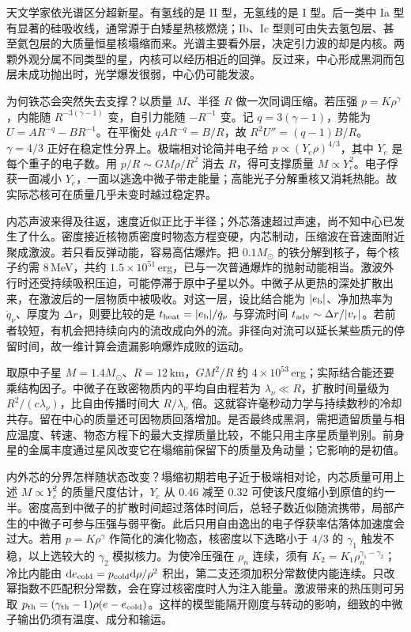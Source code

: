 天文学家依光谱区分超新星。有氢线的是 II 型，无氢线的是 I 型。后一类中 Ia 型有显著的硅吸收线，通常源于白矮星热核燃烧；Ib、Ic 型则可由失去氢包层、甚至氦包层的大质量恒星核塌缩而来。光谱主要看外层，决定引力波的却是内核。两颗外观分属不同类型的星，内核可以经历相近的回弹。反过来，中心形成黑洞而包层未成功抛出时，光学爆发很弱，中心仍可能发波。

为何铁芯会突然失去支撑？以质量 $M$、半径 $R$ 做一次同调压缩。若压强 $p=K\rho^\gamma$，内能随 $R^{-3(\gamma-1)}$ 变，自引力能随 $-R^{-1}$ 变。记 $q=3(\gamma-1)$，势能为 $U=A R^{-q}-B R^{-1}$。在平衡处 $q A R^{-q}=B/R$，故 $R^2 U''=(q-1)B/R$。$\gamma=4/3$ 正好在稳定性分界上。极端相对论简并电子给 $p\propto(Y_e\rho)^{4/3}$，其中 $Y_e$ 是每个重子的电子数。用 $p/R\sim GM\rho/R^2$ 消去 $R$，得可支撑质量 $M\propto Y_e^2$。电子俘获一面减小 $Y_e$，一面以逃逸中微子带走能量；高能光子分解重核又消耗热能。故实际芯核可在质量几乎未变时越过稳定界。

内芯声波来得及往返，速度近似正比于半径；外芯落速超过声速，尚不知中心已发生了什么。密度接近核物质密度时物态方程变硬，内芯制动，压缩波在音速面附近聚成激波。若只看反弹动能，容易高估爆炸。把 $0.1M_\odot$ 的铁分解到核子，每个核子约需 $8$\,MeV，共约 $1.5\times10^{51}$\,erg，已与一次普通爆炸的抛射动能相当。激波外行时还受持续吸积压迫，可能停滞于原中子星以外。中微子从更热的深处扩散出来，在激波后的一层物质中被吸收。对这一层，设比结合能为 $|e_{\rm b}|$、净加热率为 $\dot q_\nu$、厚度为 $\Delta r$，则要比较的是 $t_{\rm heat}=|e_{\rm b}|/\dot q_\nu$ 与穿流时间 $t_{\rm adv}\sim\Delta r/|v_r|$。若前者较短，有机会把持续向内的流改成向外的流。非径向对流可以延长某些质元的停留时间，故一维计算会遗漏影响爆炸成败的运动。

取原中子星 $M=1.4M_\odot$、$R=12$\,km，$GM^2/R$ 约 $4\times10^{53}$\,erg；实际结合能还要乘结构因子。中微子在致密物质内的平均自由程若为 $\lambda_\nu\ll R$，扩散时间量级为 $R^2/(c\lambda_\nu)$，比自由传播时间大 $R/\lambda_\nu$ 倍。这就容许毫秒动力学与持续数秒的冷却共存。留在中心的质量还可因物质回落增加。是否最终成黑洞，需把遗留质量与相应温度、转速、物态方程下的最大支撑质量比较，不能只用主序星质量判别。前身星的金属丰度通过星风改变它在塌缩前保留下的质量及角动量；它影响的是初值。

内外芯的分界怎样随状态改变？塌缩初期若电子近于极端相对论，内芯质量可用上述 $M\propto Y_e^2$ 的质量尺度估计，$Y_e$ 从 $0.46$ 减至 $0.32$ 可使该尺度缩小到原值的约一半。密度高到中微子的扩散时间超过落体时间后，总轻子数近似随流携带，局部产生的中微子可参与压强与弱平衡。此后只用自由逸出的电子俘获率估落体加速度会过大。若用 $p=K\rho^\gamma$ 作简化的演化物态，核密度以下选略小于 $4/3$ 的 $\gamma_1$ 触发不稳，以上选较大的 $\gamma_2$ 模拟核力。为使冷压强在 $\rho_n$ 连续，须有 $K_2=K_1\rho_n^{\gamma_1-\gamma_2}$；冷比内能由 $\dd e_{\rm cold}=p_{\rm cold}\dd\rho/\rho^2$ 积出，第二支还须加积分常数使内能连续。只改幂指数不匹配积分常数，会在穿过核密度时人为注入能量。激波带来的热压则可另取 $p_{\rm th}=(\gamma_{\rm th}-1)\rho(e-e_{\rm cold})$。这样的模型能隔开刚度与转动的影响，细致的中微子输出仍须有温度、成分和输运。

